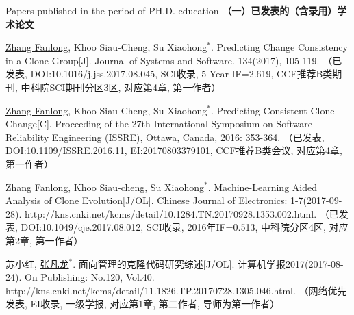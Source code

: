
 {Papers
published in the period of PH.D. education}
\noindent\textbf{（一）已发表的（含录用）学术论文}
\begin{publist}

\item
\underline{Zhang Fanlong}, Khoo Siau-Cheng, Su Xiaohong{$^*$}. Predicting Change Consistency in a Clone Group[J]. Journal of Systems and Software. 134(2017), 105-119.
（已发表, DOI:10.1016/j.jss.2017.08.045, SCI收录,  5-Year IF=2.619, CCF推荐B类期刊, 中科院SCI期刊分区3区, 对应第4章, 第一作者）

\item
\underline{Zhang Fanlong}, Khoo Siau-Cheng, Su Xiaohong{$^*$}. Predicting Consistent Clone Change[C]. Proceeding of the 27th International Symposium on Software Reliability Engineering (ISSRE), Ottawa, Canada, 2016: 353-364.
（已发表, DOI:10.1109/ISSRE.2016.11, EI:20170803379101, CCF推荐B类会议, 对应第4章, 第一作者）

\item
\underline{Zhang Fanlong}, Khoo Siau-cheng, Su Xiaohong{$^*$}. Machine-Learning Aided Analysis of Clone Evolution[J/OL]. Chinese Journal of Electronics: 1-7(2017-09-28). http://kns.cnki.net/kcms/detail/10.1284.TN.20170928.1353.002.html.
（已发表, DOI:10.1049/cje.2017.08.012, SCI收录, 2016年IF=0.513, 中科院分区4区, 对应第2章, 第一作者）


\item
苏小红, \underline{张凡龙}{$^*$}. 面向管理的克隆代码研究综述[J/OL]. 计算机学报2017(2017-08-24). On Publishing: No.120, Vol.40. http://kns.cnki.net/kcms/detail/11.1826.TP.20170728.1305.046.html.
（网络优先发表, EI收录, 一级学报, 对应第1章, 第二作者, 导师为第一作者）



\end{publist}

